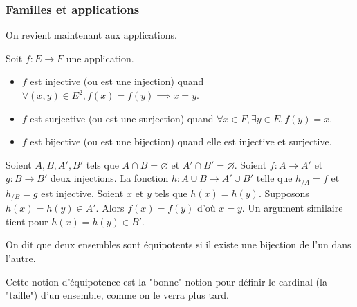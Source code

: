 \subsubsection{Familles et applications}

On revient maintenant aux applications.
\begin{defini}
	Soit $f: E \to F$ une application.
	\begin{itemize}
		\item $f$ est injective (ou est une injection) quand $\forall (x,y) \in E^2, f(x)=f(y) \implies x=y$.
		\item $f$ est surjective (ou est une surjection) quand $\forall x \in F, \exists y \in E, f(y)=x$.
		\item $f$ est bijective (ou est une bijection) quand elle est injective et surjective.
	\end{itemize}
\end{defini}

\begin{prop} \label{recolle}
	Soient $A, B, A', B'$ tels que $A\cap B = \varnothing$ et $A'\cap B' = \varnothing$. Soient $f : A \to A'$ et $g : B \to B'$ deux injections. La fonction $h : A \cup B \to A' \cup B'$ telle que $h_{/A}=f$ et $h_{/B}=g$ est injective.
	\tcblower
	Soient $x$ et $y$ tels que $h(x)=h(y)$. Supposons $h(x)=h(y)\in A'$. Alors $f(x)=f(y)$ d'où $x=y$. Un argument similaire tient pour $h(x)=h(y)\in B'$.
\end{prop}

\begin{defini}
	On dit que deux ensembles sont équipotents si il existe une bijection de l'un dans l'autre.
\end{defini}

Cette notion d'équipotence est la "bonne" notion pour définir le cardinal (la "taille") d'un ensemble, comme on le verra plus tard.  

